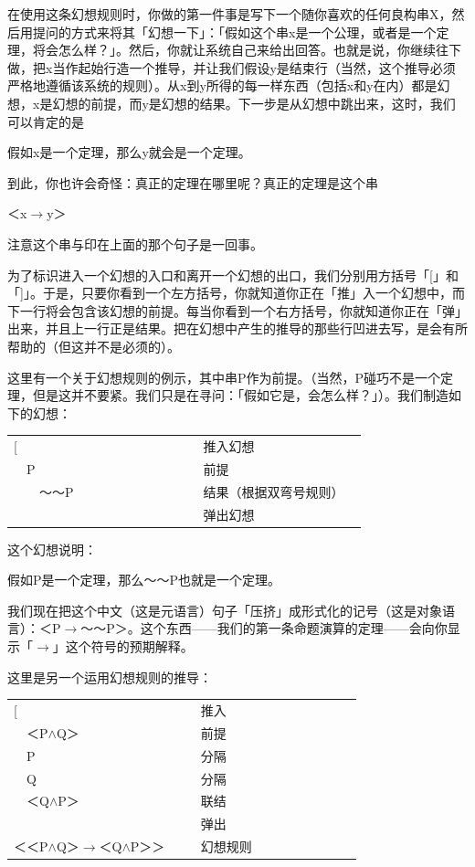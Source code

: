 \documentclass[
  12pt,
  twoside,
  openright,
  oldfontcommands,
]{memoir}
\begin{document}
在使用这条幻想规则时，你做的第一件事是写下一个随你喜欢的任何良构串X，然后用提问的方式来将其「幻想一下」：「假如这个串x是一个公理，或者是一个定理，将会怎么样？」。然后，你就让系统自己来给出回答。也就是说，你继续往下做，把x当作起始行造一个推导，并让我们假设y是结束行（当然，这个推导必须严格地遵循该系统的规则）。从x到y所得的每一样东西（包括x和y在内）都是幻想，x是幻想的前提，而y是幻想的结果。下一步是从幻想中跳出来，这时，我们可以肯定的是

假如x是一个定理，那么y就会是一个定理。

到此，你也许会奇怪：真正的定理在哪里呢？真正的定理是这个串

＜x$\rightarrow$y＞

注意这个串与印在上面的那个句子是一回事。

为了标识进入一个幻想的入口和离开一个幻想的出口，我们分别用方括号「{[}」和「{]}」。于是，只要你看到一个左方括号，你就知道你正在「推」入一个幻想中，而下一行将会包含该幻想的前提。每当你看到一个右方括号，你就知道你正在「弹」出来，并且上一行正是结果。把在幻想中产生的推导的那些行凹进去写，是会有所帮助的（但这并不是必须的）。

这里有一个关于幻想规则的例示，其中串P作为前提。（当然，P碰巧不是一个定理，但是这并不要紧。我们只是在寻问：「假如它是，会怎么样？」）。我们制造如下的幻想：

\begin{longtable}[]{>{\raggedright\arraybackslash}p{0.47\linewidth} >{\raggedright\arraybackslash}p{0.47\linewidth}}
\toprule\noalign{}
\endhead
\bottomrule\noalign{}
\endlastfoot
{[} & 　推入幻想 \\
　P & 　前提 \\
　　～～P & 　结果（根据双弯号规则） \\
{]} & 　弹出幻想 \\
\end{longtable}

这个幻想说明：

假如P是一个定理，那么～～P也就是一个定理。

我们现在把这个中文（这是元语言）句子「压挤」成形式化的记号（这是对象语言）：＜P$\rightarrow$～～P＞。这个东西------我们的第一条命题演算的定理------会向你显示「$\rightarrow$」这个符号的预期解释。

这里是另一个运用幻想规则的推导：

\begin{longtable}[]{>{\raggedright\arraybackslash}p{0.47\linewidth} >{\raggedright\arraybackslash}p{0.47\linewidth}}
\toprule\noalign{}
\endhead
\bottomrule\noalign{}
\endlastfoot
{[} & 　推入 \\
　＜P$\wedge$Q＞　 & 　前提 \\
　P　 & 　分隔 \\
　Q　 & 　分隔 \\
　＜Q$\wedge$P＞　 & 　联结 \\
{]} & 　弹出 \\
＜＜P$\wedge$Q＞$\rightarrow$＜Q$\wedge$P＞＞ & 　幻想规则 \\
\end{longtable}
\end{document}
